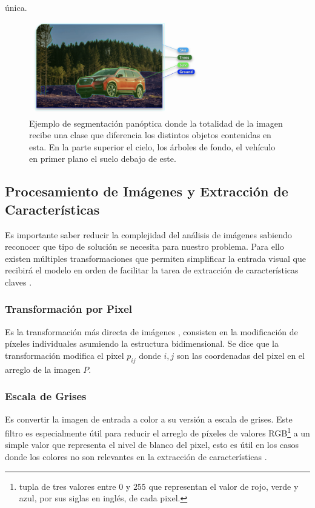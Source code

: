 \documentclass[letter,12pt]{report}
\begin{document}
\begin{itemize}
        única.
        \begin{figure}[H]
            \centering
            \includegraphics[width=0.7\textwidth]{segment}
            \caption{Ejemplo de segmentación panóptica donde la totalidad de la imagen
                recibe una clase que diferencia los distintos objetos contenidas en esta. En
                la parte superior el cielo, los árboles de fondo, el vehículo en primer plano el
            suelo debajo de este.}
            \label{fig:segment}
        \end{figure} 
\end{itemize}

\subsection{Procesamiento de Imágenes y Extracción de Características}
Es importante saber reducir la complejidad del análisis de imágenes sabiendo reconocer
que tipo de solución se necesita para nuestro problema. Para ello existen múltiples
transformaciones que permiten simplificar la entrada visual que recibirá el modelo en
orden de facilitar la tarea de extracción de características claves \cite{Prince}.

\subsubsection{Transformación por Pixel}
Es la transformación más directa de imágenes \cite{Pixel}, consisten en la modificación de
píxeles individuales asumiendo la estructura bidimensional. Se dice que la transformación
modifica el pixel $p_{ij}$ donde $i, j$ son las coordenadas del pixel en el arreglo de la
imagen $P$.

\subsubsection{Escala de Grises}
Es convertir la imagen de entrada a color a su versión a escala de grises. Este filtro es
especialmente útil para reducir el arreglo de píxeles de valores
RGB\footnote{tupla de tres valores entre $0$ y $255$ que representan el valor
de rojo, verde y azul, por sus siglas en inglés, de cada pixel.} a un simple valor
que representa el nivel de blanco del pixel, esto es útil en los casos donde los colores
no son relevantes en la extracción de características \cite{Pixel}.
\end{document}
